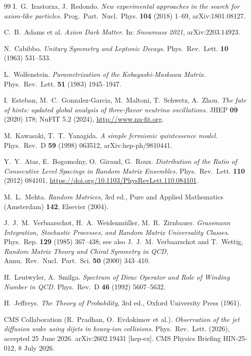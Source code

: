 \documentclass[11pt,a4paper]{article}
\theoremstyle{plain}
\theoremstyle{definition}
\theoremstyle{remark}
\begin{document}
\begin{thebibliography}{99}
I.~G.~Irastorza, J.~Redondo.
\textit{New experimental approaches in the search for axion-like
particles.}
Prog.~Part.~Nucl.~Phys. \textbf{104} (2018) 1--69,
arXiv:1801.08127.

C.~B.~Adams et al.
\textit{Axion Dark Matter.}
In: \textit{Snowmass 2021}, arXiv:2203.14923.

N.~Cabibbo.
\textit{Unitary Symmetry and Leptonic Decays.}
Phys.~Rev.~Lett. \textbf{10} (1963) 531--533.

L.~Wolfenstein.
\textit{Parametrization of the Kobayashi-Maskawa Matrix.}
Phys.~Rev.~Lett. \textbf{51} (1983) 1945--1947.

I.~Esteban, M.~C.~Gonzalez-Garcia, M.~Maltoni, T.~Schwetz, A.~Zhou.
\textit{The fate of hints: updated global analysis of three-flavor
neutrino oscillations.}
JHEP \textbf{09} (2020) 178; NuFIT 5.2 (2024),
\url{http://www.nu-fit.org}.

M.~Kawasaki, T.~T.~Yanagida.
\textit{A simple fermionic quintessence model.}
Phys.~Rev.~D \textbf{59} (1998) 063512,
arXiv:hep-ph/9810441.

Y.~Y.~Atas, E.~Bogomolny, O.~Giraud, G.~Roux.
\textit{Distribution of the Ratio of Consecutive Level Spacings in
Random Matrix Ensembles.}
Phys.~Rev.~Lett. \textbf{110} (2012) 084101,
\url{https://doi.org/10.1103/PhysRevLett.110.084101}.

M.~L.~Mehta.
\textit{Random Matrices}, 3rd ed., Pure and Applied Mathematics
(Amsterdam) \textbf{142}, Elsevier (2004).

J.~J.~M.~Verbaarschot, H.~A.~Weidenm\"uller, M.~R.~Zirnbauer.
\textit{Grassmann Integration, Stochastic Processes, and Random Matrix
Universality Classes.}
Phys.~Rep. \textbf{129} (1985) 367--438;
see also J.~J.~M.~Verbaarschot and T.~Wettig,
\textit{Random Matrix Theory and Chiral Symmetry in QCD},
Annu.~Rev.~Nucl.~Part.~Sci. \textbf{50} (2000) 343--410.

H.~Leutwyler, A.~Smilga.
\textit{Spectrum of Dirac Operator and Role of Winding Number in QCD.}
Phys.~Rev.~D \textbf{46} (1992) 5607--5632.

H.~Jeffreys.
\textit{The Theory of Probability}, 3rd ed., Oxford University Press
(1961).

CMS Collaboration (R.~Pradhan, O.~Evdokimov et al.).
\textit{Observation of the jet diffusion wake using dijets in
heavy-ion collisions.}
Phys.~Rev.~Lett. (2026), accepted 25 June 2026.
arXiv:2602.19431 [hep-ex].
CMS Physics Briefing HIN-25-012, 8 July 2026.


\end{thebibliography}
\end{document}
